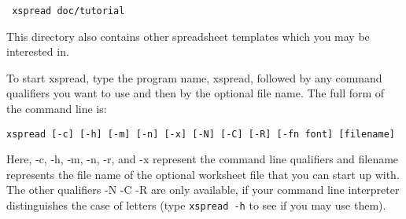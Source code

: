 \centerline{\verb| xspread doc/tutorial|}

This directory also contains other spreadsheet templates which you may be 
interested in.

    To start xspread, type the program name, xspread, followed by any command 
qualifiers you want to use and then by the optional file name.  The full form 
of the command line is:

{\tt xspread [-c] [-h] [-m] [-n] [-x] [-N] [-C] [-R] [-fn font] [filename]}

Here, -c, -h, -m, -n, -r, and -x represent the command line qualifiers and
filename represents the file name of the optional worksheet file that you can 
start up with.
The other qualifiers -N -C -R are only available, if your command line
interpreter distinguishes the case of letters (type {\tt xspread -h}
to see if you may use them).

